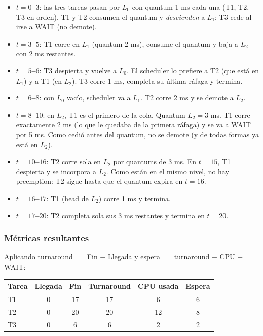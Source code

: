 \documentclass[11pt,a4paper]{article}
\begin{document}
\begin{itemize}[leftmargin=*,nosep]
    \item \textbf{$t = 0$--$3$}: las tres tareas pasan por $L_0$ con
        quantum 1 ms cada una (T1, T2, T3 en orden). T1 y T2 consumen
        el quantum y \emph{descienden} a $L_1$; T3 cede al irse a WAIT
        (no demote).
    \item \textbf{$t = 3$--$5$}: T1 corre en $L_1$ (quantum 2 ms),
        consume el quantum y baja a $L_2$ con 2 ms restantes.
    \item \textbf{$t = 5$--$6$}: T3 despierta y vuelve a $L_0$. El
        scheduler lo prefiere a T2 (que está en $L_1$) y a T1 (en
        $L_2$). T3 corre 1 ms, completa su última ráfaga y termina.
    \item \textbf{$t = 6$--$8$}: con $L_0$ vacío, scheduler va a
        $L_1$. T2 corre 2 ms y se demote a $L_2$.
    \item \textbf{$t = 8$--$10$}: en $L_2$, T1 es el primero de la
        cola. Quantum $L_2 = 3$ ms. T1 corre exactamente 2 ms (lo que
        le quedaba de la primera ráfaga) y se va a WAIT por 5 ms. Como
        cedió antes del quantum, no se demote (y de todas formas ya
        está en $L_2$).
    \item \textbf{$t = 10$--$16$}: T2 corre sola en $L_2$ por
        quantums de 3 ms. En $t = 15$, T1 despierta y se incorpora a
        $L_2$. Como están en el mismo nivel, no hay preemption: T2
        sigue hasta que el quantum expira en $t = 16$.
    \item \textbf{$t = 16$--$17$}: T1 (head de $L_2$) corre 1 ms y
        termina.
    \item \textbf{$t = 17$--$20$}: T2 completa sola sus 3 ms
        restantes y termina en $t = 20$.
\end{itemize}

\subsubsection*{Métricas resultantes}

Aplicando turnaround $=$ Fin $-$ Llegada y espera $=$ turnaround $-$
CPU $-$ WAIT:

\begin{center}
\small
\begin{tabular}{@{}lccccc@{}}
\toprule
Tarea & Llegada & Fin & Turnaround & CPU usada & Espera \\
\midrule
T1 & 0 & 17 & 17 & 6  & 6 \\
T2 & 0 & 20 & 20 & 12 & 8 \\
T3 & 0 &  6 &  6 & 2  & 2 \\
\bottomrule
\end{tabular}
\end{center}
\end{document}
